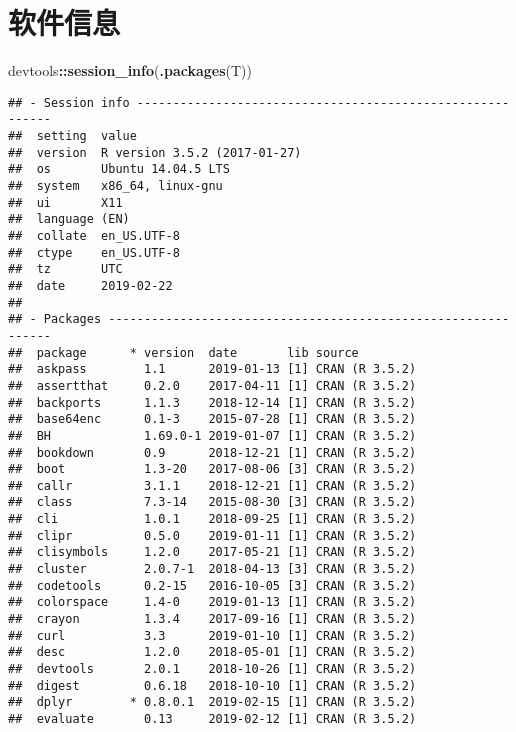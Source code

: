 \documentclass[]{book}
\newenvironment{Shaded}{\begin{snugshade}}{\end{snugshade}}
\newcommand{\KeywordTok}[1]{\textcolor[rgb]{0.13,0.29,0.53}{\textbf{#1}}}
\newcommand{\NormalTok}[1]{#1}
\newcommand{\OperatorTok}[1]{\textcolor[rgb]{0.81,0.36,0.00}{\textbf{#1}}}
\begin{document}
\hypertarget{session-info}{%
\section{软件信息}\label{session-info}}

\begin{Shaded}
\begin{Highlighting}[]
\NormalTok{devtools}\OperatorTok{::}\KeywordTok{session_info}\NormalTok{(}\KeywordTok{.packages}\NormalTok{(T))}
\end{Highlighting}
\end{Shaded}

\begin{verbatim}
## - Session info ----------------------------------------------------------
##  setting  value                       
##  version  R version 3.5.2 (2017-01-27)
##  os       Ubuntu 14.04.5 LTS          
##  system   x86_64, linux-gnu           
##  ui       X11                         
##  language (EN)                        
##  collate  en_US.UTF-8                 
##  ctype    en_US.UTF-8                 
##  tz       UTC                         
##  date     2019-02-22                  
## 
## - Packages --------------------------------------------------------------
##  package      * version  date       lib source        
##  askpass        1.1      2019-01-13 [1] CRAN (R 3.5.2)
##  assertthat     0.2.0    2017-04-11 [1] CRAN (R 3.5.2)
##  backports      1.1.3    2018-12-14 [1] CRAN (R 3.5.2)
##  base64enc      0.1-3    2015-07-28 [1] CRAN (R 3.5.2)
##  BH             1.69.0-1 2019-01-07 [1] CRAN (R 3.5.2)
##  bookdown       0.9      2018-12-21 [1] CRAN (R 3.5.2)
##  boot           1.3-20   2017-08-06 [3] CRAN (R 3.5.2)
##  callr          3.1.1    2018-12-21 [1] CRAN (R 3.5.2)
##  class          7.3-14   2015-08-30 [3] CRAN (R 3.5.2)
##  cli            1.0.1    2018-09-25 [1] CRAN (R 3.5.2)
##  clipr          0.5.0    2019-01-11 [1] CRAN (R 3.5.2)
##  clisymbols     1.2.0    2017-05-21 [1] CRAN (R 3.5.2)
##  cluster        2.0.7-1  2018-04-13 [3] CRAN (R 3.5.2)
##  codetools      0.2-15   2016-10-05 [3] CRAN (R 3.5.2)
##  colorspace     1.4-0    2019-01-13 [1] CRAN (R 3.5.2)
##  crayon         1.3.4    2017-09-16 [1] CRAN (R 3.5.2)
##  curl           3.3      2019-01-10 [1] CRAN (R 3.5.2)
##  desc           1.2.0    2018-05-01 [1] CRAN (R 3.5.2)
##  devtools       2.0.1    2018-10-26 [1] CRAN (R 3.5.2)
##  digest         0.6.18   2018-10-10 [1] CRAN (R 3.5.2)
##  dplyr        * 0.8.0.1  2019-02-15 [1] CRAN (R 3.5.2)
##  evaluate       0.13     2019-02-12 [1] CRAN (R 3.5.2)

\end{verbatim}
\end{document}

